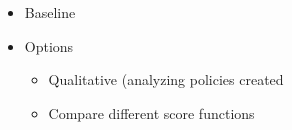 \begin{itemize}
  \item{Baseline}
  \item{Options}
  \begin{itemize}
    \item{Qualitative (analyzing policies created}
    \item{Compare different score functions}
  \end{itemize}
\end{itemize}
